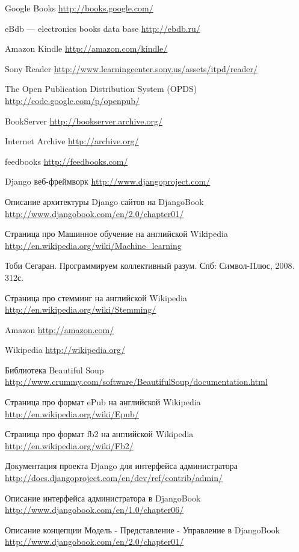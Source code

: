 \begin{thebibliography}{99}

 Google Books \url{http://books.google.com/}

 eBdb --- electronics books data base \url{http://ebdb.ru/}

 Amazon Kindle \url{http://amazon.com/kindle/}

 Sony Reader \url{http://www.learningcenter.sony.us/assets/itpd/reader/}

 The Open Publication Distribution System (OPDS) \url{http://code.google.com/p/openpub/}

 BookServer \url{http://bookserver.archive.org/}

 Internet Archive \url{http://archive.org/}

 feedbooks \url{http://feedbooks.com/}

 Django веб-фреймворк \url{http://www.djangoproject.com/}

 Описание архитектуры Django сайтов на DjangoBook \url{http://www.djangobook.com/en/2.0/chapter01/}

 Страница про Машинное обучение на английской Wikipedia \url{http://en.wikipedia.org/wiki/Machine_learning}

 Тоби Сегаран. Программируем коллективный разум. Спб: Символ-Плюс, 2008. 312с.

 Страница про стемминг на английской Wikipedia \url{http://en.wikipedia.org/wiki/Stemming/}

 Amazon \url{http://amazon.com/}

 Wikipedia \url{http://wikipedia.org/}

 Библиотека Beautiful Soup \url{http://www.crummy.com/software/BeautifulSoup/documentation.html}

 Страница про формат ePub на английской Wikipedia \url{http://en.wikipedia.org/wiki/Epub/}

 Страница про формат fb2 на английской Wikipedia \url{http://en.wikipedia.org/wiki/Fb2/}

 Документация проекта Django для интерфейса администратора \url{http://docs.djangoproject.com/en/dev/ref/contrib/admin/}

 Описание интерфейса администратора в DjangoBook \url{http://www.djangobook.com/en/1.0/chapter06/}

 Описание концепции Модель - Представление - Управление в DjangoBook
\url{http://www.djangobook.com/en/2.0/chapter01/}
\end{thebibliography}
